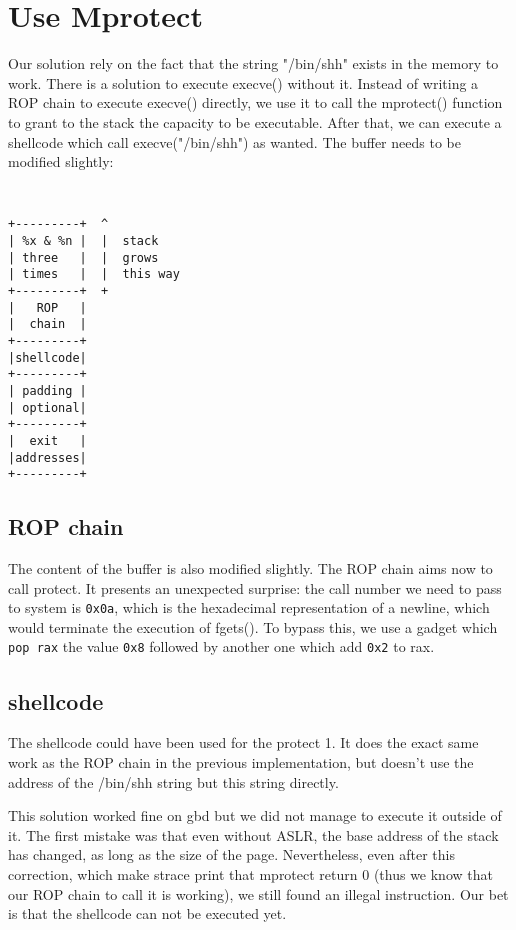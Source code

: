 \section{Use Mprotect}\label{sec:mprotectimplementation}
Our solution rely on the fact that the string "/bin/shh" exists in the memory to work. There is a solution to execute execve() without it. Instead of writing a ROP chain to execute execve() directly, we use it to call the mprotect() function to grant to the stack the capacity to be executable. After that, we can execute a shellcode which call execve("/bin/shh") as wanted.
The buffer needs to be modified slightly:
{\tt \small
\begin{verbatim}
+---------+  ^
| %x & %n |  |  stack
| three   |  |  grows
| times   |  |  this way
+---------+  +
|   ROP   |
|  chain  |
+---------+
|shellcode|
+---------+
| padding |
| optional|
+---------+
|  exit   |
|addresses|
+---------+
\end{verbatim}
}

\subsection{ROP chain}
The content of the buffer is also modified slightly.
The ROP chain aims now to call protect. It presents an unexpected surprise: the call number we need to pass to system is {\tt 0x0a}, which is the hexadecimal representation of a newline, which would terminate the execution of fgets(). To bypass this, we use a gadget which {\tt pop rax} the value {\tt 0x8} followed by another one which add {\tt 0x2} to rax.

\subsection{shellcode}
The shellcode could have been used for the protect 1. It does the exact same work as the ROP chain in the previous implementation, but doesn't use the address of the /bin/shh string but this string directly.

This solution worked fine on gbd but we did not manage to execute it outside of it. The first mistake was that even without ASLR, the base address of the stack has changed, as long as the size of the page. Nevertheless, even after this correction, which make strace print that mprotect return 0 (thus we know that our ROP chain to call it is working), we still found an illegal instruction. Our bet is that the shellcode can not be executed yet.
